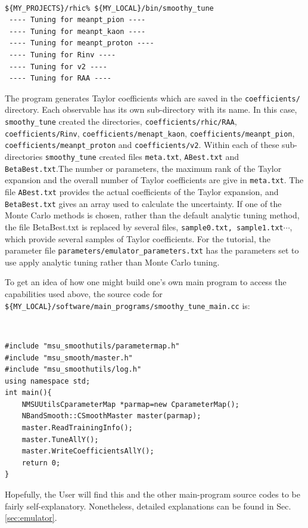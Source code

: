 \documentclass[UserManual.tex]{subfiles}
\begin{document}
{\tt
\begin{verbatim}
${MY_PROJECTS}/rhic% ${MY_LOCAL}/bin/smoothy_tune
 ---- Tuning for meanpt_pion ----
 ---- Tuning for meanpt_kaon ----
 ---- Tuning for meanpt_proton ----
 ---- Tuning for Rinv ----
 ---- Tuning for v2 ----
 ---- Tuning for RAA ----
\end{verbatim}
}
The program generates Taylor coefficients which are saved in the {\tt coefficients/} directory. Each observable has its own sub-directory with its name. In this case, {\tt smoothy\_tune} created the directories, {\tt coefficients/rhic/RAA}, {\tt coefficients/Rinv}, {\tt coefficients/menapt\_kaon}, {\tt coefficients/meanpt\_pion}, {\tt coefficients/meanpt\_proton} and {\tt coefficients/v2}. Within each of these sub-directories {\tt smoothy\_tune} created files {\tt meta.txt}, {\tt ABest.txt} and {\tt BetaBest.txt}.The number or parameters, the maximum rank of the Taylor expansion and the overall number of Taylor coefficients are give in {\tt meta.txt}. The file {\tt ABest.txt} provides the actual coefficients of the Taylor expansion, and {\tt BetaBest.txt} gives an array used to calculate the uncertainty. If one of the Monte Carlo methods is chosen, rather than the default analytic tuning method, the file {BetaBest.txt} is replaced by several files, {\tt sample0.txt, sample1.txt}$\cdots$, which provide several samples of Taylor coefficients. For the tutorial, the parameter file {\tt parameters/emulator\_parameters.txt} has the parameters set to use apply analytic tuning rather than Monte Carlo tuning.

To get an idea of how one might build one's own main program to access the capabilities used above, the source code for {\tt \$\{MY\_LOCAL\}/software/main\_programs/smoothy\_tune\_main.cc} is:
{\tt
\begin{verbatim}
#include "msu_smoothutils/parametermap.h"
#include "msu_smooth/master.h"
#include "msu_smoothutils/log.h"
using namespace std;
int main(){
	NMSUUtilsCparameterMap *parmap=new CparameterMap();
	NBandSmooth::CSmoothMaster master(parmap);	
	master.ReadTrainingInfo();
	master.TuneAllY();
	master.WriteCoefficientsAllY();
	return 0;
}
\end{verbatim}}
Hopefully, the User will find this and the other main-program source codes to be fairly self-explanatory. Nonetheless, detailed explanations can be found in Sec. \ref{sec:emulator}.
\end{document}
